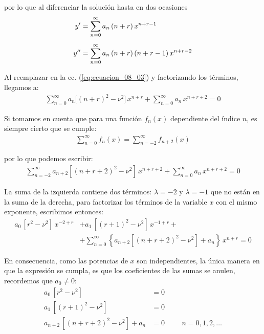 por lo que al diferenciar la solución hasta en dos ocasiones
\begin{align*}
{y}^{\prime} &= \sum_{n=0}^{\infty} a_{n} \, (n + r) \, x^{n + r - 1} \\[0.5em]
{y}^{\prime \prime} &= \sum_{n=0}^{\infty} a_{n} \, (n + r) \, (n + r - 1) \, x^{n + r - 2}
\end{align*}

Al reemplazar en la ec. (\ref{eq:ecuacion_08_03}) y factorizando los términos, llegamos a:
\begin{align*}
\sum_{n=0}^{\infty} a_{n} \bigg[ (n + r)^{2} - \nu^{2} \bigg] \, x^{n+r} + \sum_{n=0}^{\infty} a_{n} \, x^{n+r+2} = 0
\end{align*}

Si tomamos en cuenta que para una función $f_{n} (x)$ dependiente del índice $n$, es siempre cierto que se cumple:
\begin{align*}
\sum_{n=0}^{\infty} f_{n} (x) = \sum_{n=-2}^{\infty} f_{n+2} (x)
\end{align*}

por lo que podemos escribir:
\begin{align*}
\sum_{n=-2}^{\infty} a_{n+2} \left[ (n + r + 2)^{2} - \nu^{2} \right] \, x^{n+r+2} + \sum_{n=0}^{\infty} a_{n} \, x^{n+r+2} = 0
\end{align*}

La suma de la izquierda contiene dos términos: $\lambda=-2$ y $\lambda=-1$ que no están en la suma de la derecha, para factorizar los términos de la variable $x$ con el mismo exponente, escribimos entonces:
\begin{align*}
a_{0} \, [r^{2} - \nu^{2}] \, x^{-2+r} &+ a_{1} \, [(r+1)^{2} - \nu^{2}] \, x^{-1+r} + \\[0.5em]
&+ \sum_{n=0}^{\infty} \left\{ a_{n+2} [(n + r + 2)^{2} - \nu^{2}] + a_{n} \right\} \, x^{n + r} = 0
\end{align*}

En consecuencia, como las potencias de $x$ son independientes, la única manera en que la expresión se cumpla, es que los coeficientes de las sumas se anulen, recordemos que $a_{0} \neq 0$:
\begin{align*}
a_{0} \, [r^{2} - \nu^{2}] &= 0 \\[0.5em]
a_{1} \, [(r + 1)^{2} - \nu^{2}] &= 0 \\[0.5em]
a_{n+2} \, [(n + r + 2)^{2} - \nu^{2}] + a_{n} &= 0 \hspace{1cm} n = 0, 1, 2, \ldots
\end{align*}

